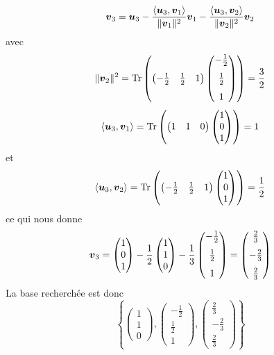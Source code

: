 \begin{exemple}
\[
\boldsymbol{v}_3 = \boldsymbol{u}_3 - \frac{\langle\boldsymbol{u}_3, \boldsymbol{v}_1\rangle}{\lVert\boldsymbol{v}_1\rVert^2}\boldsymbol{v}_1
- \frac{\langle\boldsymbol{u}_3, \boldsymbol{v}_2\rangle}{\lVert\boldsymbol{v}_2\rVert^2}\boldsymbol{v}_2
\] 
avec
\[
\lVert\boldsymbol{v}_2\rVert^2 = \operatorname{Tr}\left(\begin{pmatrix}
-\frac12 & \frac12 & 1
\end{pmatrix}\begin{pmatrix}
-\frac12 \\[7pt] \frac12 \\[7pt] 1
\end{pmatrix}\right) = \frac32
\]
\[
\langle\boldsymbol{u}_3, \boldsymbol{v}_1\rangle = \operatorname{Tr}\left(\begin{pmatrix}
1 & 1 & 0
\end{pmatrix}\begin{pmatrix}
1 \\ 0 \\ 1
\end{pmatrix}\right) = 1
\]
et
\[
\langle\boldsymbol{u}_3, \boldsymbol{v}_2\rangle = \operatorname{Tr}\left(\begin{pmatrix}
-\frac12 & \frac12 & 1
\end{pmatrix}\begin{pmatrix}
1 \\ 0 \\ 1
\end{pmatrix}\right) = \frac12
\]
ce qui nous donne
\[
\boldsymbol{v}_3 = \begin{pmatrix}
1 \\ 0 \\ 1
\end{pmatrix}
- \frac12 \begin{pmatrix}
1 \\ 1 \\ 0
\end{pmatrix}
- \frac13 \begin{pmatrix}
-\frac12 \\[7pt] \frac12 \\[7pt] 1
\end{pmatrix}
= \begin{pmatrix}
\frac23 \\[7pt] -\frac23 \\[7pt] \frac23
\end{pmatrix}
\]
La base recherchée est donc
\[
\left\{   \begin{pmatrix}
1 \\ 1 \\ 0
\end{pmatrix}, 
 \begin{pmatrix}
-\frac12 \\[7pt] \frac12 \\[7pt] 1
\end{pmatrix}, 
 \begin{pmatrix}
\frac23 \\[7pt] -\frac23 \\[7pt] \frac23
\end{pmatrix} \right\}
\]
\end{exemple}

